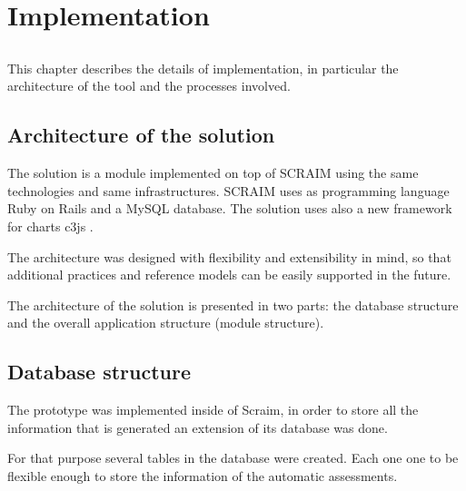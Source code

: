 \chapter{Implementation} \label{chap:implementation}

\section*{}

This chapter describes the details of implementation, in particular the architecture of the tool and the processes involved.

\section{Architecture of the solution} \label{sec:evaluation}

The solution is a module implemented on top of SCRAIM using the same technologies and same infrastructures. SCRAIM uses as programming language Ruby on Rails \citep{hansson2009ruby} and a MySQL \citep{MySql} database. The solution uses also a new framework for charts c3js \citep{c3js}.

The architecture was designed with flexibility and extensibility in mind, so that additional practices and reference models can be easily supported in the future.

The architecture of the solution is presented in two parts: the database structure and the overall application structure (module structure).



\section{Database structure}\label{database}

The prototype was implemented inside of Scraim, in order to store all the information that is generated an extension of its database was done.

For that purpose several tables in the database were created. Each one one to be flexible enough to store the information of the automatic assessments.

